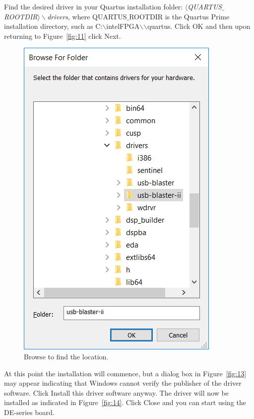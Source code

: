 \documentclass[11pt, twoside, pdftex]{article}
\begin{document}
Find the desired driver in your Quartus installation folder: 
{\it $\langle$QUARTUS$\_$ROOTDIR$\rangle\backslash$drivers}, where 
\linebreak
QUARTUS$\_$ROOTDIR is the Quartus Prime installation directory, such as
C:$\backslash$intelFPGA$\backslash$\versnum$\backslash$quartus.
Click {\sf OK} and then upon returning to Figure~\ref{fig:11} click {\sf Next}.

\begin{figure}[H]
	\begin{center}
		\includegraphics[scale=0.65]{figures/figure12.png}
		\caption{Browse to find the location.} 
		\label{fig:12}
	\end{center}
\end{figure}

At this point the installation will commence, but a dialog box in Figure~\ref{fig:13} may appear
indicating that Windows cannot verify the publisher of the driver software. Click {\sf Install this driver software anyway}.  The driver will now be installed as indicated in Figure~\ref{fig:14}.
Click {\sf Close} and you can start using the DE-series board.
\end{document}
